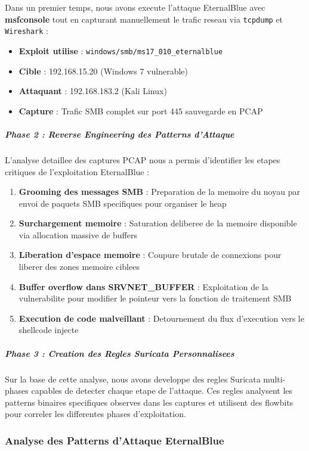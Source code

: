 Dans un premier temps, nous avons execute l'attaque EternalBlue avec \textbf{msfconsole} tout en capturant manuellement le trafic reseau via \texttt{tcpdump} et \texttt{Wireshark} :

\begin{itemize}
    \item \textbf{Exploit utilise} : \texttt{windows/smb/ms17\_010\_eternalblue}
    \item \textbf{Cible} : 192.168.15.20 (Windows 7 vulnerable)
    \item \textbf{Attaquant} : 192.168.183.2 (Kali Linux)
    \item \textbf{Capture} : Trafic SMB complet sur port 445 sauvegarde en PCAP
\end{itemize}

\subparagraph{Phase 2 : Reverse Engineering des Patterns d{'}Attaque}

L{'}analyse detaillee des captures PCAP nous a permis d{'}identifier les etapes critiques de l{'}exploitation EternalBlue :

\begin{enumerate}
    \item \textbf{Grooming des messages SMB} : Preparation de la memoire du noyau par envoi de paquets SMB specifiques pour organiser le heap
    \item \textbf{Surchargement memoire} : Saturation deliberee de la memoire disponible via allocation massive de buffers
    \item \textbf{Liberation d{'}espace memoire} : Coupure brutale de connexions pour liberer des zones memoire ciblees
    \item \textbf{Buffer overflow dans SRVNET\_BUFFER} : Exploitation de la vulnerabilite pour modifier le pointeur vers la fonction de traitement SMB
    \item \textbf{Execution de code malveillant} : Detournement du flux d{'}execution vers le shellcode injecte
\end{enumerate}

\subparagraph{Phase 3 : Creation des Regles Suricata Personnalisees}

Sur la base de cette analyse, nous avons developpe des regles Suricata multi-phases capables de detecter chaque etape de l{'}attaque. Ces regles analysent les patterns binaires specifiques observes dans les captures et utilisent des flowbits pour correler les differentes phases d{'}exploitation.

\subsubsection{Analyse des Patterns d{'}Attaque EternalBlue}

